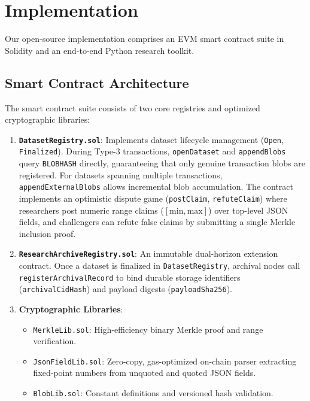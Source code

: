 \section{Implementation}
\label{sec:implementation}

Our open-source implementation comprises an EVM smart contract suite in Solidity and an end-to-end Python research toolkit.

\subsection{Smart Contract Architecture}
The smart contract suite consists of two core registries and optimized cryptographic libraries:
\begin{enumerate}
    \item \textbf{\texttt{DatasetRegistry.sol}}: Implements dataset lifecycle management (\texttt{Open}, \texttt{Finalized}). During Type-3 transactions, \texttt{openDataset} and \texttt{appendBlobs} query \texttt{BLOBHASH} directly, guaranteeing that only genuine transaction blobs are registered. For datasets spanning multiple transactions, \texttt{appendExternalBlobs} allows incremental blob accumulation. The contract implements an optimistic dispute game (\texttt{postClaim}, \texttt{refuteClaim}) where researchers post numeric range claims ($[\text{min}, \text{max}]$) over top-level JSON fields, and challengers can refute false claims by submitting a single Merkle inclusion proof.
    \item \textbf{\texttt{ResearchArchiveRegistry.sol}}: An immutable dual-horizon extension contract. Once a dataset is finalized in \texttt{DatasetRegistry}, archival nodes call \texttt{registerArchivalRecord} to bind durable storage identifiers (\texttt{archivalCidHash}) and payload digests (\texttt{payloadSha256}).
    \item \textbf{Cryptographic Libraries}:
    \begin{itemize}
        \item \texttt{MerkleLib.sol}: High-efficiency binary Merkle proof and range verification.
        \item \texttt{JsonFieldLib.sol}: Zero-copy, gas-optimized on-chain parser extracting fixed-point numbers from unquoted and quoted JSON fields.
        \item \texttt{BlobLib.sol}: Constant definitions and versioned hash validation.
    \end{itemize}
\end{enumerate}

